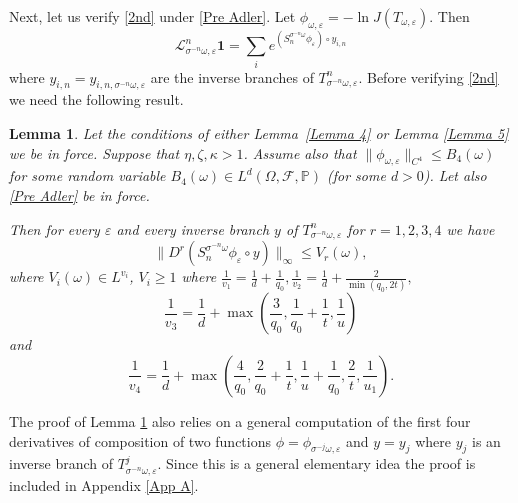 \documentclass[11pt,reqno,a4paper]{article}
\newtheorem{lemma}[theorem]{Lemma}
\theoremstyle{special}
\renewcommand{\L}{\mathcal{L}}
\def\om{\omega}
\begin{document}
Next, let us verify \eqref{2nd} under \eqref{Pre Adler}.
Let $\phi_{\omega,\varepsilon}=-\ln J(T_{\omega,\varepsilon})$. Then  
$$
\L_{\sigma^{-n}\omega,\varepsilon}^n\textbf{1}=\sum_{i}e^{(S_n^{\sigma^{-n}\omega} \phi_\varepsilon)\circ y_{i,n}}
$$
where $y_{i,n}=y_{i,n,\sigma^{-n}\omega,\varepsilon}$ are the inverse branches of $T_{\sigma^{-n}\omega,\varepsilon}^n$.
Before verifying \eqref{2nd} we need the following result. %
\begin{lemma}\label{phi lem}
Let the  conditions of either
Lemma~\ref{Lemma 4} or Lemma \ref{Lemma 5} we  be in force. Suppose that $\eta,\zeta,\kappa>1$. Assume also that  $\|\phi_{\om, \varepsilon}\|_{C^4}\leq B_4(\om)$ for some random variable $B_4(\om)\in L^d(\Omega,\mathcal F,\mathbb P)$ (for some $d>0$). Let also \eqref{Pre Adler} be in force.  

Then for every $\varepsilon$ and every inverse branch $y$ of $T_{\sigma^{-n}\om, \varepsilon}^n$ 
for $r=1,2,3,4$ we have  
$$
\|D^r(S_n^{\sigma^{-n}\omega}\phi_\varepsilon \circ y)\|_{\infty}\leq V_r(\om),
$$
where $V_i(\om)\in L^{v_i}$, $V_i\geq 1$ where
$
\frac1{v_1}=\frac{1}{d}+\frac{1}{q_0}, \frac1{v_2}=\frac{1}{d}+\frac{2}{\min(q_0,2t)},$
$$
\frac{1}{v_3}=\frac{1}{d}+\max\left(\frac{3}{q_0},\frac{1}{q_0}+\frac{1}t,\frac{1}u\right) 
$$
and 
$$
\frac{1}{v_4}=\frac1d+\max\left(\frac{4}{q_0},\frac{2}{q_0}+\frac{1}t,\frac{1}u+\frac{1}{q_0},\frac{2}{t},\frac1{u_1}\right).
$$


\end{lemma}
The proof of Lemma \ref{phi lem} also relies on a general computation of the first four derivatives of composition of two functions $\phi=\phi_{\sigma^{-j}\om, \varepsilon}$ and $y=y_j$ where $y_j$ is an inverse branch of $T_{\sigma^{-n}\om, \varepsilon}^j$. Since this is a general elementary idea the proof is included in Appendix \ref{App A}.
\end{document}

